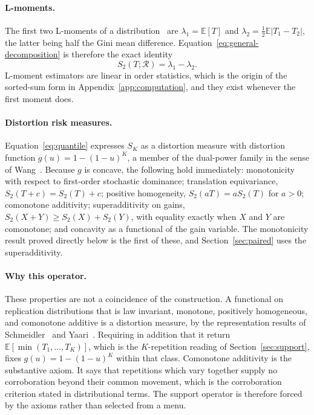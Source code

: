 \documentclass[11pt]{article}
\newcommand{\Regime}{\mathcal{R}}
\newcommand{\E}{\mathbb{E}}
\theoremstyle{remark}
\begin{document}
\paragraph{L-moments.}
The first two L-moments of a distribution~\cite{hosking1990lmoments} are $\lambda_1=\E[T]$ and $\lambda_2=\tfrac12\E|T_1-T_2|$, the latter being half the Gini mean difference. Equation~\eqref{eq:general-decomposition} is therefore the exact identity
\[
S_2(T;\Regime)=\lambda_1-\lambda_2 .
\]
L-moment estimators are linear in order statistics, which is the origin of the sorted-sum form in Appendix~\ref{app:computation}, and they exist whenever the first moment does.

\paragraph{Distortion risk measures.}
Equation~\eqref{eq:quantile} expresses $S_K$ as a distortion measure with distortion function $g(u)=1-(1-u)^{K}$, a member of the dual-power family in the sense of Wang~\cite{wang1996premium}. Because $g$ is concave, the following hold immediately: monotonicity with respect to first-order stochastic dominance; translation equivariance, $S_2(T+c)=S_2(T)+c$; positive homogeneity, $S_2(aT)=aS_2(T)$ for $a>0$; comonotone additivity; superadditivity on gains, $S_2(X+Y)\geq S_2(X)+S_2(Y)$, with equality exactly when $X$ and $Y$ are comonotone; and concavity as a functional of the gain variable. The monotonicity result proved directly below is the first of these, and Section~\ref{sec:paired} uses the superadditivity.

\paragraph{Why this operator.}
These properties are not a coincidence of the construction. A functional on replication distributions that is law invariant, monotone, positively homogeneous, and comonotone additive is a distortion measure, by the representation results of Schmeidler~\cite{schmeidler1986integral} and Yaari~\cite{yaari1987dual}. Requiring in addition that it return $\E[\min(T_1,\ldots,T_K)]$, which is the $K$-repetition reading of Section~\ref{sec:support}, fixes $g(u)=1-(1-u)^{K}$ within that class. Comonotone additivity is the substantive axiom. It says that repetitions which vary together supply no corroboration beyond their common movement, which is the corroboration criterion stated in distributional terms. The support operator is therefore forced by the axioms rather than selected from a menu.
\end{document}
